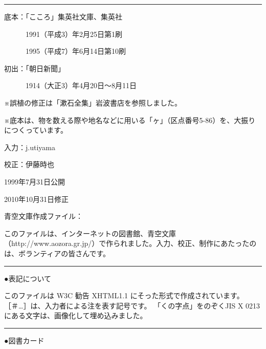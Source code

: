 \documentclass[a4j,onecolumn]{tarticle}
\begin{document}
        \vspace{1zw plus .1zw minus .4zw}


        

\noindent
        \hfil
        \rule{133.875pt}{.01zw}
        \hfill


\par{}
底本：「こころ」集英社文庫、\hbox{}集英社\par{}
　　　1991（平成3）年2月25日第1刷\par{}
　　　1995（平成7）年6月14日第10刷\par{}
初出：「朝日新聞」\par{}
　　　1914（大正3）年4月20日～8月11日\par{}
※誤植の修正は「漱石全集」岩波書店を参照しました。\hbox{}\par{}
※底本は、\hbox{}物を数える際や地名などに用いる「ヶ」（区点番号5-86）を、\hbox{}大振りにつくっています。\hbox{}\par{}
入力：j.utiyama\par{}
校正：伊藤時也\par{}
1999年7月31日公開\par{}
2010年10月31日修正\par{}
青空文庫作成ファイル：\par{}
このファイルは、\hbox{}インターネットの図書館、\hbox{}青空文庫（http://www.aozora.gr.jp/）で作られました。\hbox{}入力、\hbox{}校正、\hbox{}制作にあたったのは、\hbox{}ボランティアの皆さんです。\hbox{}\par{}\par{}\par{}



        \vspace{1zw plus .1zw minus .4zw}


        

\noindent
        \hfil
        \rule{133.875pt}{.01zw}
        \hfill


\par{}
●表記について\par{}
このファイルは W3C 勧告 XHTML1.1 にそった形式で作成されています。\hbox{}
	［＃…］は、\hbox{}入力者による注を表す記号です。\hbox{}
	「くの字点」をのぞくJIS X 0213にある文字は、\hbox{}画像化して埋め込みました。\hbox{}




        \vspace{1zw plus .1zw minus .4zw}


        

\noindent
        \hfil
        \rule{133.875pt}{.01zw}
        \hfill


\par{}●図書カード
\end{document}
